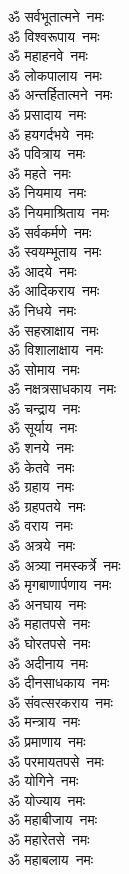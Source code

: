 \begin{multicols}{2}
\begin{flushleft}
ॐ सर्वभूतात्मने~नमः\\
ॐ विश्वरूपाय~नमः\\
ॐ महाहनवे~नमः\\
ॐ लोकपालाय~नमः\\
ॐ अन्तर्हितात्मने~नमः\\
ॐ प्रसादाय~नमः\\
ॐ हयगर्दभये~नमः\\
ॐ पवित्राय~नमः\hfill{}\\
ॐ महते~नमः\\
ॐ नियमाय~नमः\\
ॐ नियमाश्रिताय~नमः\\
ॐ सर्वकर्मणे~नमः\\
ॐ स्वयम्भूताय~नमः\\
ॐ आदये~नमः\\
ॐ आदिकराय~नमः\\
ॐ निधये~नमः\\
ॐ सहस्राक्षाय~नमः\\
ॐ विशालाक्षाय~नमः\hfill{}\\
ॐ सोमाय~नमः\\
ॐ नक्षत्रसाधकाय~नमः\\
ॐ चन्द्राय~नमः\\
ॐ सूर्याय~नमः\\
ॐ शनये~नमः\\
ॐ केतवे~नमः\\
ॐ ग्रहाय~नमः\\
ॐ ग्रहपतये~नमः\\
ॐ वराय~नमः\\
ॐ अत्रये~नमः\hfill{}\\
ॐ अत्र्या नमस्कर्त्रे~नमः\\
ॐ मृगबाणार्पणाय~नमः\\
ॐ अनघाय~नमः\\
ॐ महातपसे~नमः\\
ॐ घोरतपसे~नमः\\
ॐ अदीनाय~नमः\\
ॐ दीनसाधकाय~नमः\\
ॐ संवत्सरकराय~नमः\\
ॐ मन्त्राय~नमः\\
ॐ प्रमाणाय~नमः\hfill{}\\
ॐ परमायतपसे~नमः\\
ॐ योगिने~नमः\\
ॐ योज्याय~नमः\\
ॐ महाबीजाय~नमः\\
ॐ महारेतसे~नमः\\
ॐ महाबलाय~नमः\\

\end{flushleft}
\end{multicols}
